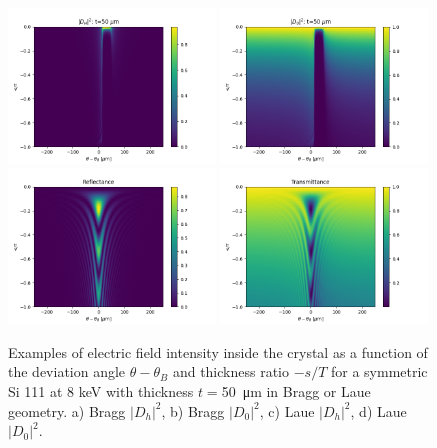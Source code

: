 \documentclass[preprint]{iucr}              %
\begin{document}
\begin{figure}\label{fig:braggMap}
    \centering
    \includegraphics[width=0.49\textwidth]{figures/Bragg_DH.png}
    \includegraphics[width=0.49\textwidth]{figures/Bragg_D0.png}
    \includegraphics[width=0.49\textwidth]{figures/Laue_DH.png}
    \includegraphics[width=0.49\textwidth]{figures/Laue_D0.png}
    \caption{Examples of electric field intensity inside the crystal as a function of the 
    deviation angle $\theta-\theta_B$ and thickness ratio $-s/T$ for a symmetric Si 111 at 8 keV with thickness $t=$\SI{50}{\micro\meter} in Bragg or Laue geometry. 
    a) Bragg $|D_h|^2$, b) Bragg $|D_0|^2$,
    c) Laue $|D_h|^2$, d) Laue $|D_0|^2$.
    }
\end{figure}
\end{document}
